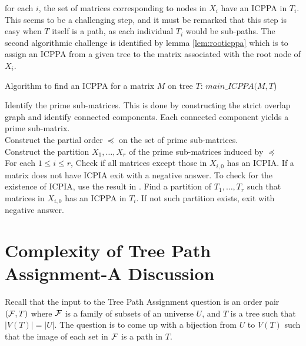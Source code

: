 for each $i$, the set of matrices corresponding to nodes in $X_i$ have
an ICPPA in $T_i$.  This seems to be a challenging step, and it must
be remarked that this step is easy when $T$ itself is a path, as each
individual $T_i$ would be sub-paths.  The second algorithmic challenge
is identified by lemma \ref{lem:rooticppa} which is to assign an ICPPA
from a given tree to the matrix associated with the root node of
$X_i$.
\begin{algorithm}[h]
  \caption{Algorithm to find an ICPPA for a matrix $M$ on tree $T$:
    $main\_ICPPA(M, T$)}
  \label{al:icppa-main}
  \begin{algorithmic}
    \STATE Identify the prime sub-matrices. This is done by constructing the strict overlap graph and identify connected components.  Each connected component yields a prime sub-matrix.   \\
    \STATE Construct the partial order $\preccurlyeq$ on the set of prime sub-matrices.  \\
    \STATE Construct the partition $X_1,\ldots,X_r$ of the prime
    sub-matrices induced by $\preccurlyeq$ \\
    \STATE For each $1 \leq i \leq r$, Check if all matrices except
    those in $X_{i,0}$ has an ICPIA.  If a matrix does not have ICPIA
    exit with a negative answer.  To check for the existence of ICPIA,
    use the result in \cite{nsnrs09}.  \STATE Find a partition of
    $T_1, \ldots, T_r$ such that matrices in $X_{i,0}$ has an ICPPA in
    $T_i$.  If not such partition exists, exit with negative answer.
  \end{algorithmic}
\end{algorithm}


\section{Complexity of Tree Path Assignment-A Discussion}
\label{complexity}
Recall that the input to the Tree Path Assignment question is an order
pair $({\cal F},T)$ where ${\cal F}$ is a family of subsets of an universe $U$,
and $T$ is a tree such that $|V(T)| = |U|$.  The question is to come
up with a bijection from $U$ to $V(T)$ such that the image of each set
in ${\cal F}$ is a path in $T$.


